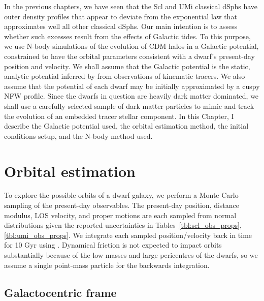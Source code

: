 In the previous chapters, we have seen that the Scl and UMi classical
dSphs have outer density profiles that appear to deviate from the
exponential law that approximates well all other classical dSphs. Our
main intention is to assess whether such excesses result from the
effects of Galactic tides. To this purpose, we use N-body simulations of
the evolution of CDM halos in a Galactic potential, constrained to have
the orbital parameters consistent with a dwarf's present-day position
and velocity. We shall assume that the Galactic potential is the static,
analytic potential inferred by \citet{mcmillan2011} from observations of
kinematic tracers. We also assume that the potential of each dwarf may
be initially approximated by a cuspy NFW profile. Since the dwarfs in
question are heavily dark matter dominated, we shall use a carefully
selected sample of dark matter particles to mimic and track the
evolution of an embedded tracer stellar component. In this Chapter, I
describe the Galactic potential used, the orbital estimation method, the
initial conditions setup, and the N-body method used.

\section{Orbital estimation}\label{orbital-estimation}

To explore the possible orbits of a dwarf galaxy, we perform a Monte
Carlo sampling of the present-day observables. The present-day position,
distance modulus, LOS velocity, and proper motions are each sampled from
normal distributions given the reported uncertainties in
Tables~\ref{tbl:scl_obs_props}, \ref{tbl:umi_obs_props}. We integrate
each sampled position/velocity back in time for 10 Gyr using \agama{}
\citep{agama}. Dynamical friction is not expected to impact orbits
substantially because of the low masses and large pericentres of the
dwarfs, so we assume a single point-mass particle for the backwards
integration.

\subsection{Galactocentric frame}\label{galactocentric-frame}

